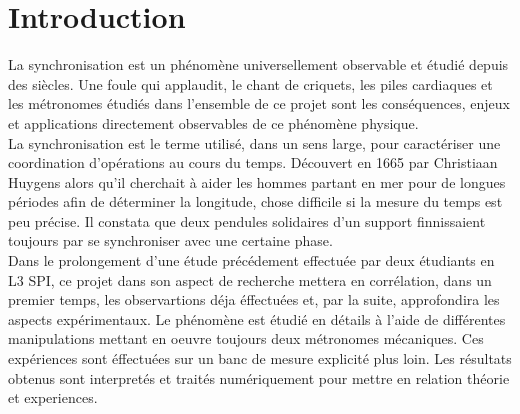 \documentclass[a4paper,11pt]{report}
\begin{document}
\maketitle %
\newpage
{} \setcounter{page}{1} %
\newpage
\null
\thispagestyle{empty}
\newpage
{\tableofcontents}
\listoffigures
\newpage
\chapter*{Introduction}
 \setcounter{page}{1} %
	La synchronisation est un phénomène universellement observable et étudié depuis des siècles. Une foule qui applaudit, le chant de criquets, les piles cardiaques et les métronomes étudiés dans l'ensemble de ce projet sont les conséquences, enjeux et applications directement observables de ce phénomène physique.\\

	La synchronisation est le terme utilisé, dans un sens large, pour caractériser une coordination d'opérations au cours du temps. Découvert en 1665 par Christiaan Huygens alors qu'il cherchait à aider les hommes partant en mer pour de longues périodes afin de déterminer la longitude, chose difficile si la mesure du temps est peu précise. Il constata que deux pendules solidaires d'un support finnissaient toujours par se synchroniser avec une certaine phase.\\

	Dans le prolongement d'une étude précédement effectuée par deux étudiants en L3 SPI, ce projet dans son aspect de recherche mettera en corrélation, dans un premier temps, les observartions déja éffectuées et, par la suite, approfondira les aspects expérimentaux. Le phénomène est étudié en détails à l'aide de différentes manipulations mettant en oeuvre toujours deux métronomes mécaniques. Ces expériences sont éffectuées sur un banc de mesure explicité plus loin. Les résultats obtenus sont interpretés et traités numériquement pour mettre en relation théorie et experiences.
\end{document}

